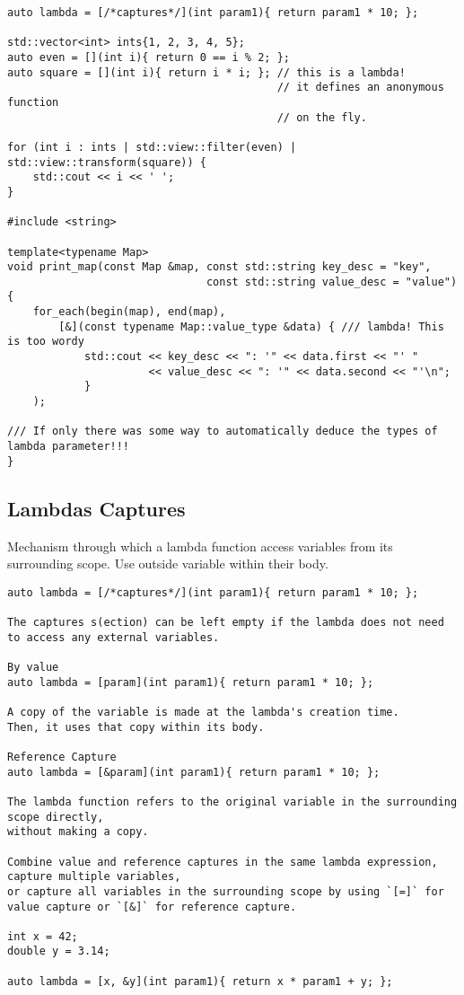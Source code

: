 \begin{verbatim}
auto lambda = [/*captures*/](int param1){ return param1 * 10; };

std::vector<int> ints{1, 2, 3, 4, 5};
auto even = [](int i){ return 0 == i % 2; };
auto square = [](int i){ return i * i; }; // this is a lambda!
                                          // it defines an anonymous function
                                          // on the fly.

for (int i : ints | std::view::filter(even) | std::view::transform(square)) {
    std::cout << i << ' ';
}

#include <string>

template<typename Map>
void print_map(const Map &map, const std::string key_desc = "key",
                               const std::string value_desc = "value")
{
    for_each(begin(map), end(map),
        [&](const typename Map::value_type &data) { /// lambda! This is too wordy
            std::cout << key_desc << ": '" << data.first << "' "
                      << value_desc << ": '" << data.second << "'\n";
            }
    );

/// If only there was some way to automatically deduce the types of lambda parameter!!!
}
\end{verbatim}

\subsection{Lambdas Captures}

Mechanism through which a lambda function access variables from its surrounding scope.
Use outside variable within their body.

\begin{verbatim}
auto lambda = [/*captures*/](int param1){ return param1 * 10; };

The captures s(ection) can be left empty if the lambda does not need to access any external variables.

By value
auto lambda = [param](int param1){ return param1 * 10; };

A copy of the variable is made at the lambda's creation time.
Then, it uses that copy within its body. 

Reference Capture
auto lambda = [&param](int param1){ return param1 * 10; };

The lambda function refers to the original variable in the surrounding scope directly,
without making a copy. 

Combine value and reference captures in the same lambda expression, 
capture multiple variables, 
or capture all variables in the surrounding scope by using `[=]` for value capture or `[&]` for reference capture.

int x = 42;
double y = 3.14;

auto lambda = [x, &y](int param1){ return x * param1 + y; };
\end{verbatim}

